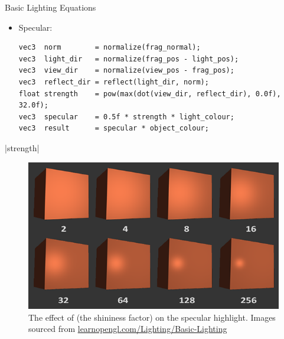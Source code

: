 \documentclass{beamer}
\begin{document}
\begin{frame}[fragile]{Basic Lighting Equations}
    \begin{itemize}
        \item Specular:
              \footnotesize{
                  \begin{verbatim}
vec3  norm        = normalize(frag_normal);
vec3  light_dir   = normalize(frag_pos - light_pos);
vec3  view_dir    = normalize(view_pos - frag_pos);
vec3  reflect_dir = reflect(light_dir, norm);
float strength    = pow(max(dot(view_dir, reflect_dir), 0.0f), 32.0f);
vec3  specular    = 0.5f * strength * light_colour;
vec3  result      = specular * object_colour;
\end{verbatim}
              }
    \end{itemize}

    |strength|
    \begin{figure}
        \centering
        \includegraphics[height=0.30\textheight]{images/specular_shininess.png}
        \caption{The effect of {\color{blue}} (the shininess factor) on the specular highlight. \footnotesize{Images sourced from \url{learnopengl.com/Lighting/Basic-Lighting}}}
    \end{figure}

\end{frame}
\end{document}
